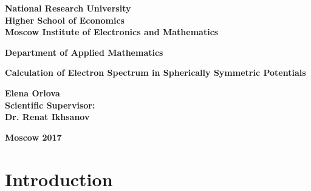 \documentclass[a4paper, 12pt]{article}
\begin{document}
	\thispagestyle{empty}
	\begin{center}
		\large
		\textbf{National Research University}			
		\\
		\textbf{Higher School of Economics}									\\[3 cm]
		\textbf{Moscow Institute of Electronics and Mathematics}			\\[2 cm]
									
	\end{center}
	
	\begin{center}
		\large
		\textbf{Department of Applied Mathematics}		\\[3 cm]
	\end{center}
	
	
	
	\begin{center}
		\large
		\textbf{Calculation of Electron Spectrum in Spherically Symmetric Potentials}		\\[6 cm]
		
	\end{center}
	
	\begin{flushright}
		\large
		\textbf{Elena Orlova}				\\
		\textbf{Scientific Supervisor:}			\\
		\textbf{Dr. Renat Ikhsanov}		\\
	\end{flushright}
	
	\vfill
	\begin{center}
		\large
		\textbf{Moscow 2017}
	\end{center}
	\pagebreak
	
	
	


\tableofcontents
\pagebreak
	
\section{Introduction}
\end{document}
